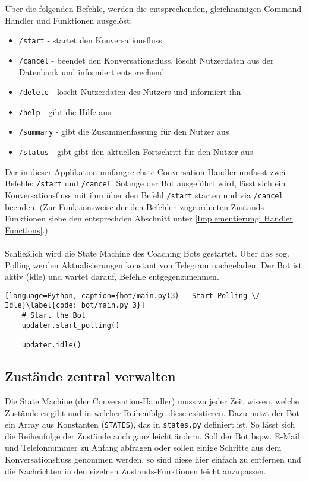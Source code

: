         Über die folgenden Befehle, werden die entsprechenden, gleichnamigen Command-Handler und Funktionen ausgelöst: 
        \begin{itemize}
            \item \verb|/start| - startet den Konversationsfluss
            \item \verb|/cancel| - beendet den Konversationsfluss, löscht Nutzerdaten aus der Datenbank und informiert entsprechend
            \item \verb|/delete| - löscht Nutzerdaten des Nutzers und informiert ihn
            \item \verb|/help| - gibt die Hilfe aus
            \item \verb|/summary| - gibt die Zusammenfassung für den Nutzer aus
            \item \verb|/status| - gibt gibt den aktuellen Fortschritt für den Nutzer aus
        \end{itemize}
        Der in dieser Applikation umfangreichste Conversation-Handler umfasst zwei Befehle: \verb|/start| und \verb|/cancel|. Solange der Bot ausgeführt wird, lässt sich ein Konversationsfluss mit ihm über den Befehl \verb|/start| starten und via \verb|/cancel| beenden. (Zur Funktionsweise der den Befehlen zugeordneten Zustands-Funktionen siehe den entsprechden Abschnitt unter \ref{Implementierung: Handler Functions}.) \\ \\
        
        Schließlich wird die State Machine des Coaching Bots gestartet. Über das sog. Polling werden Aktualisierungen konstant von Telegram nachgeladen. Der Bot ist aktiv (idle) und wartet darauf, Befehle entgegenzunehmen.
        \begin{lstlisting}[language=Python, caption={bot/main.py(3) - Start Polling \/ Idle}\label{code: bot/main.py 3}]
    # Start the Bot
    updater.start_polling()

    updater.idle()
        \end{lstlisting}

        \subsection{Zustände zentral verwalten} \label{Implementierung: states.py}
            Die State Machine (der Conversation-Handler) muss zu jeder Zeit wissen, welche Zustände es gibt und in welcher Reihenfolge diese existieren. Dazu nutzt der Bot ein Array aus Konstanten (\verb|STATES|), das in \verb|states.py| definiert ist. So lässt sich die Reihenfolge der Zustände auch ganz leicht ändern. Soll der Bot bspw. E-Mail und Telefonnummer zu Anfang abfragen oder sollen einige Schritte aus dem Konversationsfluss genommen werden, so sind diese hier einfach zu entfernen und die Nachrichten in den eizelnen Zustands-Funktionen leicht anzupassen.\\
    
